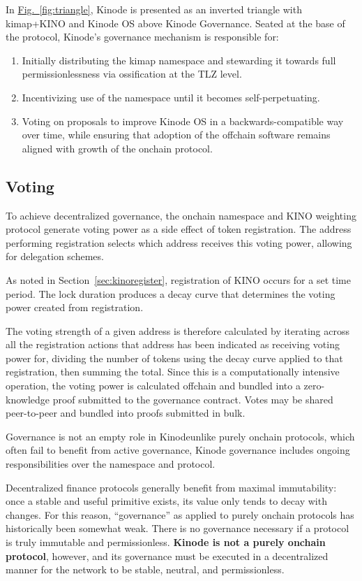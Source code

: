 \documentclass[runningheads]{llncs}
\begin{document}
In \hyperref[fig:triangle]{Fig.~\ref{fig:triangle}}, Kinode is presented as an inverted triangle with kimap+KINO and Kinode OS above Kinode Governance.
Seated at the base of the protocol, Kinode's governance mechanism is responsible for:
\begin{enumerate}
    \item Initially distributing the kimap namespace and stewarding it towards full permissionlessness via ossification at the TLZ level.
    \item Incentivizing use of the namespace until it becomes self-perpetuating.
    \item Voting on proposals to improve Kinode OS in a backwards-compatible way over time, while ensuring that adoption of the offchain software remains aligned with growth of the onchain protocol.
\end{enumerate}

\subsection{Voting}
\label{sec:voting}

To achieve decentralized governance, the onchain namespace and KINO weighting protocol generate voting power as a side effect of token registration.
The address performing registration selects which address receives this voting power, allowing for delegation schemes.

As noted in Section~\ref{sec:kinoregister}, registration of KINO occurs for a set time period.
The lock duration produces a decay curve that determines the voting power created from registration.

The voting strength of a given address is therefore calculated by iterating across all the registration actions that address has been indicated as receiving voting power for, dividing the number of tokens using the decay curve applied to that registration, then summing the total.
Since this is a computationally intensive operation, the voting power is calculated offchain and bundled into a zero-knowledge proof submitted to the governance contract.
Votes may be shared peer-to-peer and bundled into proofs submitted in bulk.

Governance is not an empty role in Kinode\textemdash unlike purely onchain protocols, which often fail to benefit from active governance, Kinode governance includes ongoing responsibilities over the namespace and protocol.

Decentralized finance protocols generally benefit from maximal immutability: once a stable and useful primitive exists, its value only tends to decay with changes.
For this reason, ``governance'' as applied to purely onchain protocols has historically been somewhat weak.
There is no governance necessary if a protocol is truly immutable and permissionless. \textbf{Kinode is not a purely onchain protocol}, however, and its governance must be executed in a decentralized manner for the network to be stable, neutral, and permissionless.
\end{document}
